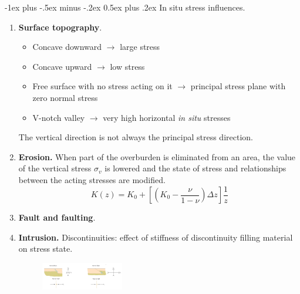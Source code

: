 \documentclass[10pt,landscape,a4paper]{article}
\makeatletter
\renewcommand{\section}{\@startsection{section}{1}{0mm}%
	{-1ex plus -.5ex minus -.2ex}%
	{0.5ex plus .2ex}%
	{\normalfont\large\bfseries}}
\makeatother
\begin{document}
\begin{multicols}{3}
		\section{In situ stress influences.}
		\begin{enumerate}
			\item \textbf{Surface topography}.
			\begin{itemize}
				\item Concave downward $\to$ large stress
				\item Concave upward $\to$ low stress
				\item Free surface with no stress acting on it $\to$ principal stress plane with zero normal stress
				\item V-notch valley $\to$ very high horizontal \textit{in situ} stresses
			\end{itemize}
			The vertical direction is not always the principal stress direction.
			\item \textbf{Erosion.} When part of the overburden is eliminated from an area, the value of the vertical stress $\sigma_v$ is lowered and the state of stress and relationships between the acting stresses are modified.
			\[
				K(z)=K_0+\left[\left(K_0-\frac{\nu}{1-\nu}\right)\Delta z\right]\frac{1}{z}
			\]
			\item \textbf{Fault and faulting}.
			\item \textbf{Intrusion.} Discontinuities: effect of stiffness of discontinuity filling material on stress state.
			\begin{figure}[H]
				\centering
				\includegraphics[width=0.34\textwidth]{fault-and-faulting}
			\end{figure}
		\end{enumerate}
		

\end{multicols}
\end{document}
